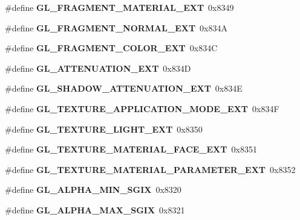 \begin{DoxyCompactItemize}
\item 
\#define {\bfseries G\+L\+\_\+\+F\+R\+A\+G\+M\+E\+N\+T\+\_\+\+M\+A\+T\+E\+R\+I\+A\+L\+\_\+\+E\+X\+T}~0x8349\label{_s_d_l__opengl_8h_aa3e080bdfb1e68121887caf358cc1c19}

\item 
\#define {\bfseries G\+L\+\_\+\+F\+R\+A\+G\+M\+E\+N\+T\+\_\+\+N\+O\+R\+M\+A\+L\+\_\+\+E\+X\+T}~0x834\+A\label{_s_d_l__opengl_8h_a5a8e1b6ba9a8a6c19acd22c6f351780e}

\item 
\#define {\bfseries G\+L\+\_\+\+F\+R\+A\+G\+M\+E\+N\+T\+\_\+\+C\+O\+L\+O\+R\+\_\+\+E\+X\+T}~0x834\+C\label{_s_d_l__opengl_8h_adc43e787c5815fc88a7a687b223ffd75}

\item 
\#define {\bfseries G\+L\+\_\+\+A\+T\+T\+E\+N\+U\+A\+T\+I\+O\+N\+\_\+\+E\+X\+T}~0x834\+D\label{_s_d_l__opengl_8h_a7cd0e84405a119805cb2677c1123d631}

\item 
\#define {\bfseries G\+L\+\_\+\+S\+H\+A\+D\+O\+W\+\_\+\+A\+T\+T\+E\+N\+U\+A\+T\+I\+O\+N\+\_\+\+E\+X\+T}~0x834\+E\label{_s_d_l__opengl_8h_a6888682f836607310c8f192bd95ae31e}

\item 
\#define {\bfseries G\+L\+\_\+\+T\+E\+X\+T\+U\+R\+E\+\_\+\+A\+P\+P\+L\+I\+C\+A\+T\+I\+O\+N\+\_\+\+M\+O\+D\+E\+\_\+\+E\+X\+T}~0x834\+F\label{_s_d_l__opengl_8h_aa651f1b39d2c44457de7ac6f9eff793c}

\item 
\#define {\bfseries G\+L\+\_\+\+T\+E\+X\+T\+U\+R\+E\+\_\+\+L\+I\+G\+H\+T\+\_\+\+E\+X\+T}~0x8350\label{_s_d_l__opengl_8h_a8376fe57f5e88774396255dc94218999}

\item 
\#define {\bfseries G\+L\+\_\+\+T\+E\+X\+T\+U\+R\+E\+\_\+\+M\+A\+T\+E\+R\+I\+A\+L\+\_\+\+F\+A\+C\+E\+\_\+\+E\+X\+T}~0x8351\label{_s_d_l__opengl_8h_ae4ba5757ac3cb19d684a781bf397cc79}

\item 
\#define {\bfseries G\+L\+\_\+\+T\+E\+X\+T\+U\+R\+E\+\_\+\+M\+A\+T\+E\+R\+I\+A\+L\+\_\+\+P\+A\+R\+A\+M\+E\+T\+E\+R\+\_\+\+E\+X\+T}~0x8352\label{_s_d_l__opengl_8h_a6c549217c4cd57a6720a26f7852de568}

\item 
\#define {\bfseries G\+L\+\_\+\+A\+L\+P\+H\+A\+\_\+\+M\+I\+N\+\_\+\+S\+G\+I\+X}~0x8320\label{_s_d_l__opengl_8h_a46c94ba0429896780e87011658b547f3}

\item 
\#define {\bfseries G\+L\+\_\+\+A\+L\+P\+H\+A\+\_\+\+M\+A\+X\+\_\+\+S\+G\+I\+X}~0x8321\label{_s_d_l__opengl_8h_a33b980aa2c6ad851a764a6f4c216cb67}


\end{DoxyCompactItemize}
